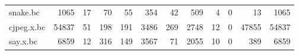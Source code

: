 \begin{table}[ht]
\begin{adjustbox}{width=1.3\textwidth}
\begin{tabular}{lrrrrrrrrrrr}
 snake.bc             &                1065 &                   17 &                         70 &                   55 &                      354 &                                 42 &                           509 &                   4 &                                         0 &                                          13 &                 1065 \\
 cjpeg.x.bc           &               54837 &                   51 &                        198 &                  191 &                     3486 &                                269 &                          2748 &                  12 &                                         0 &                                       47855 &                54837 \\
 say.x.bc             &                6859 &                   12 &                        316 &                  149 &                     3567 &                                 71 &                          2055 &                  10 &                                         0 &                                         389 &                 6859 \\
\hline
\end{tabular}

\end{adjustbox}
\end{table}
